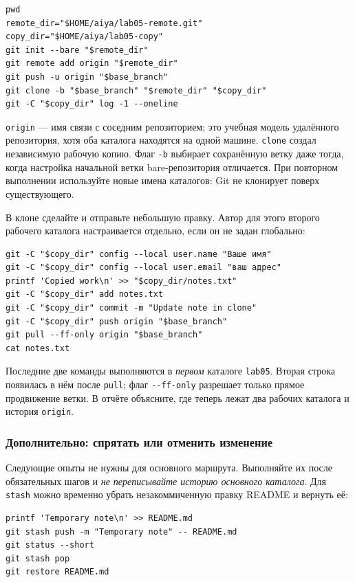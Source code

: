 \begin{verbatim}
pwd
remote_dir="$HOME/aiya/lab05-remote.git"
copy_dir="$HOME/aiya/lab05-copy"
git init --bare "$remote_dir"
git remote add origin "$remote_dir"
git push -u origin "$base_branch"
git clone -b "$base_branch" "$remote_dir" "$copy_dir"
git -C "$copy_dir" log -1 --oneline
\end{verbatim}

\texttt{origin} --- имя связи с соседним репозиторием; это учебная модель
удалённого репозитория, хотя оба каталога находятся на одной машине.
\texttt{clone} создал независимую рабочую копию. Флаг \texttt{-b}
выбирает сохранённую ветку даже тогда, когда настройка начальной ветки
bare-репозитория отличается. При повторном выполнении используйте новые
имена каталогов: Git не клонирует поверх существующего.

В клоне сделайте и отправьте небольшую правку. Автор для этого второго
рабочего каталога настраивается отдельно, если он не задан глобально:

\begin{verbatim}
git -C "$copy_dir" config --local user.name "Ваше имя"
git -C "$copy_dir" config --local user.email "ваш адрес"
printf 'Copied work\n' >> "$copy_dir/notes.txt"
git -C "$copy_dir" add notes.txt
git -C "$copy_dir" commit -m "Update note in clone"
git -C "$copy_dir" push origin "$base_branch"
git pull --ff-only origin "$base_branch"
cat notes.txt
\end{verbatim}

Последние две команды выполняются в \emph{первом} каталоге
\texttt{lab05}. Вторая строка появилась в нём после \texttt{pull}; флаг
\texttt{-{}-ff-only} разрешает только прямое продвижение ветки. В отчёте
объясните, где теперь лежат два рабочих каталога и история \texttt{origin}.

\subsubsection*{Дополнительно: спрятать или отменить изменение}

Следующие опыты не нужны для основного маршрута. Выполняйте их после
обязательных шагов и \emph{не переписывайте историю основного каталога}.
Для \texttt{stash} можно временно убрать незакоммиченную правку README
и вернуть её:

\begin{verbatim}
printf 'Temporary note\n' >> README.md
git stash push -m "Temporary note" -- README.md
git status --short
git stash pop
git restore README.md
\end{verbatim}

